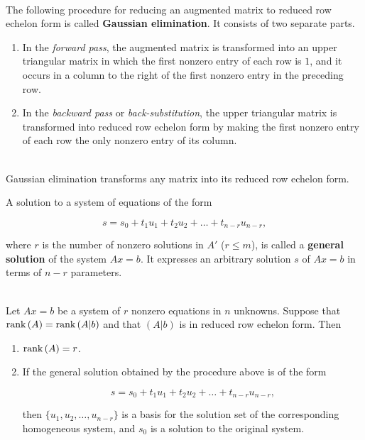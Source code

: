 \begin{definition}
	\hfill\\
	The following procedure for reducing an augmented matrix to reduced row echelon form is called \textbf{Gaussian elimination}. It consists of two separate parts.

	\begin{enumerate}
		\item In the \textit{forward pass}, the augmented matrix is transformed into an upper triangular matrix in which the first nonzero entry of each row is $1$, and it occurs in a column to the right of the first nonzero entry in the preceding row.

		\item In the \textit{backward pass} or \textit{back-substitution}, the upper triangular matrix is transformed into reduced row echelon form by making the first nonzero entry of each row the only nonzero entry of its column.
	\end{enumerate}
\end{definition}

\begin{theorem}
	\hfill\\
	Gaussian elimination transforms any matrix into its reduced row echelon form.
\end{theorem}

\begin{definition}
	A solution to a system of equations of the form

	\[s = s_0 + t_1u_1 + t_2u_2 + \dots +t_{n-r}u_{n-r},\]

	where $r$ is the number of nonzero solutions in $A'$ ($r \leq m$), is called a \textbf{general solution} of the system $Ax = b$. It expresses an arbitrary solution $s$ of $Ax = b$ in terms of $n - r$ parameters.
\end{definition}

\begin{theorem}
	\hfill\\
	Let $Ax = b$ be a system of $r$ nonzero equations in $n$ unknowns. Suppose that $\text{rank}\left(A\right) = \text{rank}\left(A|b\right)$ and that $(A|b)$ is in reduced row echelon form. Then

	\begin{enumerate}
		\item $\text{rank}\left(A\right) = r$.
		\item If the general solution obtained by the procedure above is of the form

		      \[s = s_0 + t_1u_1 + t_2u_2 + \dots + t_{n-r}u_{n-r},\]

		      then $\{u_1, u_2, \dots, u_{n-r}\}$ is a basis for the solution set of the corresponding homogeneous system, and $s_0$ is a solution to the original system.
	\end{enumerate}
\end{theorem}

